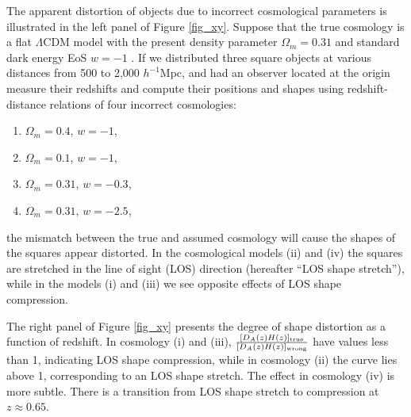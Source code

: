 \documentclass[iop]{emulateapj}
\begin{document}
The apparent distortion of objects due to incorrect cosmological parameters is illustrated in the left panel of Figure \ref{fig_xy}.
Suppose that the true cosmology is a flat $\Lambda$CDM model with the present density parameter $\Omega_m=0.31$
and standard dark energy EoS $w=-1$ \citep[the best $\Lambda$CDM model determined by Planck 2015 results][]{Planck2015}.
If we distributed three square objects at various distances from 500 to 2,000 $h^{-1}$Mpc,
and had an observer located at the origin measure their redshifts and compute their positions and shapes 
using redshift-distance relations of four incorrect cosmologies:
\begin{enumerate}[label=(\roman*)]
\item $\Omega_m=0.4$, $w=-1$,
\item $\Omega_m=0.1$, $w=-1$,
\item $\Omega_m=0.31$, $w=-0.3$,
\item $\Omega_m=0.31$, $w=-2.5$,
\end{enumerate}
the mismatch between the true and assumed cosmology will cause the shapes of the squares appear distorted.
In the cosmological models (ii) and (iv) the squares are stretched in the line of sight (LOS) direction (hereafter ``LOS shape stretch''),
while in the models (i) and (iii) we see opposite effects of LOS shape compression.


The right panel of Figure \ref{fig_xy} presents the degree of shape distortion as a function of redshift. 
In cosmology (i) and (iii), $\frac{[D_A(z)H(z)]_{\rm true}}{[D_A(z)H(z)]_{\rm wrong}}$ have values less than 1, 
indicating LOS shape compression,
while in cosmology (ii) the curve lies above 1, 
corresponding to an LOS shape stretch.
The effect in cosmology (iv) is more subtle. 
There is a transition from LOS shape stretch to compression at $z \approx 0.65$.
\end{document}
